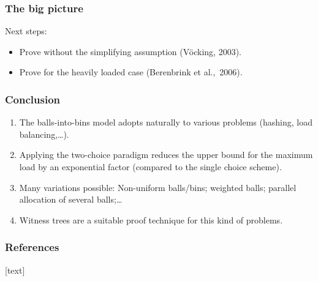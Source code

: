 \documentclass[serif,professionalfonts]{beamer}
\begin{document}
\begin{frame}
\frametitle{The big picture}
\theoremVocking
\assumptionOne
\medskip 
Next steps:
\begin{itemize}
\item Prove \alert{without} the simplifying assumption (V\"ocking, 2003).
\item Prove for the \alert{heavily loaded} case (Berenbrink et al.,~2006).
\end{itemize}
\end{frame}

\begin{frame}
\frametitle{Conclusion}
\begin{enumerate}
\item The balls-into-bins model \alert{adopts naturally} to various problems (hashing, load balancing,\dots).
\item Applying the two-choice paradigm reduces the upper bound for the maximum load by an \alert{exponential factor} (compared to the single choice scheme).
\item \alert{Many variations} possible: Non-uniform balls/bins; weighted balls; parallel allocation of several balls;\dots
\item \alert{Witness trees} are a suitable proof technique for this kind of problems.
\end{enumerate}
\end{frame}

\begin{frame}[shrink]
\frametitle<presentation>{References}    

\nocite{VOC03}
\nocite{ABKU99}
\nocite{RS98}
\nocite{BCSV06}
\nocite{capocelli1990generalized}
[text]

\end{frame} 	
\end{document}
